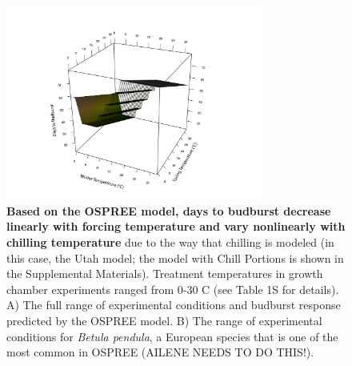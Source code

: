 \documentclass{article}
\begin{document}
\newpage
\begin{figure}[h!]
\centering
\noindent \includegraphics[width=0.75\textwidth]{..//..//analyses/bb_analysis/figures/bbmod_3dplot_utah_edited.pdf}
\caption{\textbf{Based on the OSPREE model, days to budburst decrease linearly with forcing temperature and vary nonlinearly with chilling temperature} due to the way that chilling is modeled (in this case, the Utah model; the model with Chill Portions is shown in the Supplemental Materials). Treatment temperatures in growth chamber experiments ranged from 0-30 \degree C (see Table 1S for details). A) The full range of experimental conditions and budburst response predicted by the OSPREE model. B) The range of experimental conditions for \emph{Betula pendula}, a European species that is one of the most common in OSPREE (AILENE NEEDS TO DO THIS!).
}
\label{fig:apc}
\end{figure}
\newpage
\end{document}
